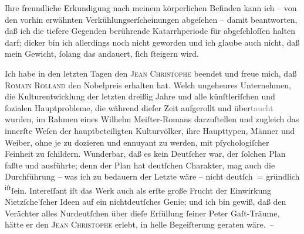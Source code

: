 \pstart
           Ihre freundliche Erkundigung nach meinem körperlichen Befinden kann ich – von den
               vorhin erwähnten Verkühlungserſcheinungen abgeſehen – damit beantworten, daß ich die
               tiefere Gegenden berührende Katarrhperiode für
               abgeſchloſſen halten darf; dicker bin ich allerdings noch nicht geworden und ich
               glaube auch nicht, daß mein Gewicht,{ }ſolang das \label{K_L02246-1v}\label{K_L02246-1} andauert, {\pb}ſich{ }ſteigern wird.\pend
           
\pstart
           Ich habe in den letzten Tagen den \textsc{Jean Christophe} beendet und freue mich, daß \textsc{Romain Rolland} den Nobelpreis erhalten hat. Welch
               ungeheures Unternehmen, die Kulturentwicklung der letzten dreißig Jahre und alle
               künſtleriſchen und{ }ſozialen Hauptprobleme, die während dieſer Zeit aufgerollt und
                  über\textcolor{gray}{taucht} wurden, im Rahmen eines Wilhelm Meiſter-Romans darzuſtellen und zugleich das innerſte
               Weſen der hauptbeteiligten Kulturvölker, ihre Haupttypen, Männer und Weiber, ohne je
               zu dozieren und ennuyant zu werden, mit \label{T_L02246-1v}\label{T_L02246-1} pſychologiſcher
               Feinheit  zu{ }ſchildern. Wunderbar, daß es kein
               Deutſcher war, der{ }ſolchen Plan faßte und ausführte; denn der Plan hat deutſchen
               Charakter, mag auch die Durchführung – was ich zu bedauern {\pb}der Letzte wäre – nicht deutſch = gründlich \substVorne{}\textsuperscript{iſt}\substDazwischen{}ſein\substHinten{}. Intereſſant iſt das Werk auch als erſte große Frucht der Einwirkung Nietzſche’ſcher Ideen auf ein nichtdeutſches
               Genie; und ich bin gewiß, daß den Verächter alles Nurdeutſchen über dieſe Erfüllung{ }ſeiner Peter Gaſt-Träume, hätte er den \textsc{Jean Christophe} erlebt, in helle Begeiſterung geraten wäre. –\pend
           
